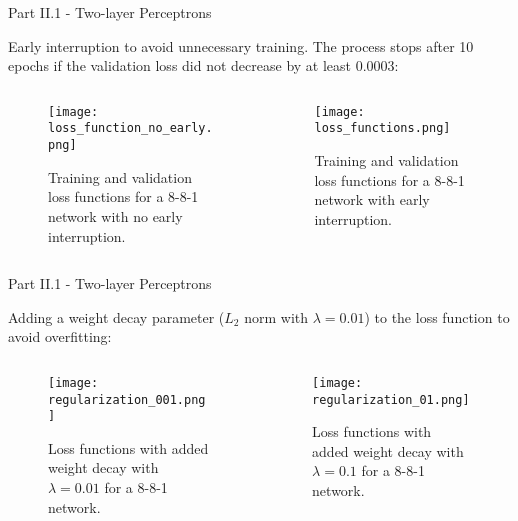 \documentclass{beamer}
\begin{document}
\begin{frame}{Part II.1 - Two-layer Perceptrons}


Early interruption to avoid unnecessary training. The process stops after 10 epochs if the validation loss did not decrease by at least 0.0003:

  \begin{columns}[T]
    \begin{column}{.5\textwidth}
    \begin{block}{}
    \begin{figure} [H]
    \centering
    \texttt{[image: loss\_function\_no\_early.png]}
    \caption{Training and validation loss functions for a 8-8-1 network with no early interruption.}
    \end{figure}
    \end{block}
    \end{column}
    \begin{column}{.5\textwidth}
    \begin{block}{}
    \begin{figure} [H]
    \centering
    \texttt{[image: loss\_functions.png]}
    \caption{Training and validation loss functions for a 8-8-1 network with early interruption.}
    \end{figure}
    \end{block}
    \end{column}
  \end{columns}
    
\end{frame}


\begin{frame}{Part II.1 - Two-layer Perceptrons}
    
    Adding a weight decay parameter ($L_2$ norm with $\lambda=0.01$) to the loss function to avoid overfitting:
    
  \begin{columns}[T]
    \begin{column}{.5\textwidth}
    \begin{block}{}
    \begin{figure} [H]
    \centering
    \texttt{[image: regularization\_001.png]}
    \caption{Loss functions with added weight decay with $\lambda=0.01$ for a 8-8-1 network.}
    \end{figure}
    \end{block}
    \end{column}
    \begin{column}{.5\textwidth}
    \begin{block}{}
    \begin{figure} [H]
    \centering
    \texttt{[image: regularization\_01.png]}
    \caption{Loss functions with added weight decay with $\lambda=0.1$ for a 8-8-1 network.}
    \end{figure}
    \end{block}
    \end{column}
  \end{columns}
    
\end{frame}
\end{document}
